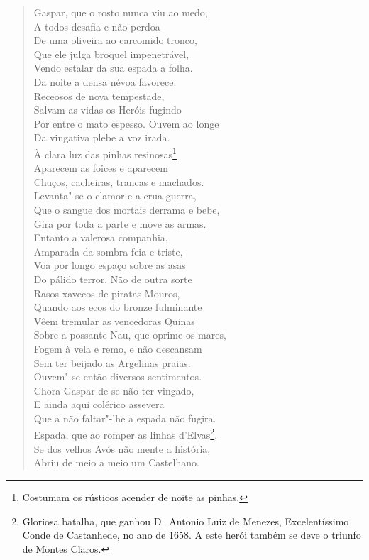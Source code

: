 \begin{verse}
Gaspar, que o rosto nunca viu ao medo,\\
A todos desafia e não perdoa\\
De uma oliveira ao carcomido tronco,\\
Que ele julga broquel impenetrável,\\
Vendo estalar da sua espada a folha. \\[10pt]


Da noite a densa névoa favorece.\\
Receosos de nova tempestade,\\
Salvam as vidas os Heróis fugindo\\
Por entre o mato espesso. Ouvem ao longe\\
Da vingativa plebe a voz irada.\\
À clara luz das pinhas resinosas\footnote{ Costumam os rústicos acender de noite as pinhas.}\\
Aparecem as foices e aparecem\\
Chuços, cacheiras, trancas e machados.\\
Levanta"-se o clamor e a crua guerra,\\
Que o sangue dos mortais derrama e bebe,\\
Gira por toda a parte e move as armas.\\
Entanto a valerosa companhia,\\
Amparada da sombra feia e triste,\\
Voa por longo espaço sobre as asas\\
Do pálido terror. Não de outra sorte\\
Rasos xavecos de piratas Mouros,\\		\index{\Xavec}
Quando aos ecos do bronze fulminante\\
Vêem tremular as vencedoras Quinas\\
Sobre a possante Nau, que oprime os mares,\\
Fogem à vela e remo, e não descansam\\
Sem ter beijado as Argelinas praias.\\
Ouvem"-se  então diversos sentimentos.\\
Chora Gaspar de se não ter vingado,\\
E ainda aqui colérico assevera\\		\index{\Coler}
Que a não faltar"-lhe a espada não fugira.\\
Espada, que ao romper as linhas d'Elvas\footnote{ Gloriosa batalha,
que ganhou D.~Antonio Luiz de Menezes, Excelentíssimo Conde de Castanhede, no
ano de 1658. A este herói também se deve o triunfo de Montes Claros.},\\		\index{\Elvas}
Se dos velhos Avós não mente a história,\\
Abriu de meio a meio um Castelhano. \\[10pt] 



\end{verse}
